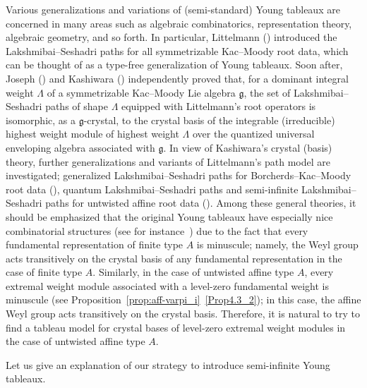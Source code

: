 \documentclass[ALCO,ThmDefs,Unicode,epreuves]{cedram}
\newcommand{\Fg}{\mathfrak{g}}
\begin{document}
Various generalizations and variations of (semi-standard) Young tableaux 
are concerned in many areas such as 
algebraic combinatorics, representation theory, algebraic geometry, and so forth. 
In particular, 
Littelmann (\cite{L94,L95}) introduced the Lakshmibai--Seshadri paths 
for all symmetrizable Kac--Moody root data, 
which can be thought of as a type-free generalization of Young tableaux. 
Soon after, Joseph (\cite{J}) and Kashiwara (\cite{K96}) independently proved that, 
for a dominant integral weight $\Lambda$ of a symmetrizable Kac--Moody Lie algebra $\Fg$, 
the set of Lakshmibai--Seshadri paths of shape $\Lambda$ 
equipped with Littelmann's root operators 
is isomorphic, as a $\Fg$-crystal, to the crystal basis of 
the integrable (irreducible) highest weight module of highest weight $\Lambda$ 
over the quantized universal enveloping algebra associated with $\Fg$. 
In view of Kashiwara's crystal (basis) theory, 
further generalizations and variants of Littelmann's path model are investigated; \eg generalized 
Lakshmibai--Seshadri paths for Borcherds--Kac--Moody root data (\cite{I,JL}), 
quantum Lakshmibai--Seshadri paths and 
semi-infinite Lakshmibai--Seshadri paths for untwisted affine root data
(\cite{INS16,LNSSS16}). 
Among these general theories, 
it should be emphasized that the original Young tableaux have especially nice combinatorial structures 
(see for instance~\cite{F,Kw})
due to the fact that every fundamental representation of finite type $A$ is minuscule; 
namely, the Weyl group acts transitively 
on the crystal basis of any fundamental representation in the case of finite type $A$. 
Similarly, in the case of untwisted affine type $A$, 
every extremal weight module associated with a 
level-zero fundamental weight is minuscule (see Proposition~\ref{prop:aff-varpi_i}~\ref{Prop4.3_2}); 
in this case, the affine Weyl group acts transitively on the crystal basis. 
Therefore, it is natural to try to find a tableau model 
for crystal bases of level-zero extremal weight modules 
in the case of untwisted affine type $A$. 

Let us give an explanation of our strategy to introduce semi-infinite Young tableaux. 
\end{document}

